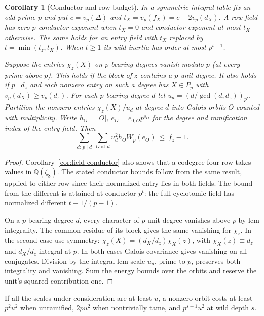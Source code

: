 \documentclass[11pt,a4paper]{article}
\numberwithin{equation}{section}
\newtheorem{corollary}[theorem]{Corollary}
\theoremstyle{remark}
\newcommand{\QQ}{\mathbb Q}
\begin{document}
\begin{corollary}[Conductor and row budget]\label{fam:M:5.5}\label{cor:table-defect-filtration}
\label{prop:defect-filtration-energy}\label{cor:mixed-block-general-energy}
In a symmetric integral table fix an odd prime $p$ and put $c=v_p(\Delta)$ and
$t_X=v_p(f_X)=c-2v_p(d_X)$. A row field has zero $p$-conductor
exponent when $t_X=0$ and conductor exponent at most $t_X$
otherwise. The same holds for an entry field with $t_X$ replaced by
$t=\min(t_z,t_X)$. When $t\ge1$ its wild inertia has order at most
$p^{t-1}$.

Suppose the entries $\chi_z(X)$ on $p$-bearing degrees vanish
modulo $p$ (at every prime above $p$). This holds if the block of
$z$ contains a $p$-unit degree. It also holds if $p\mid d_z$ and
each nonzero entry on such a degree has $X\in P_p$ with
$v_p(d_X)\ge v_p(d_z)$. For each $p$-bearing degree $d$ let $u_d=(d/\gcd(d,d_z))_{p'}$.
Partition the nonzero entries $\chi_z(X)/u_d$ at degree $d$ into
Galois orbits $O$ counted with multiplicity. Write $h_O=|O|$,
$e_O=e_{0,O}p^{s_O}$ for the degree and ramification index of the
entry field. Then
\begin{equation}\label{eq:merged-row-budget}
 \sum_{d:\,p\mid d}\ \sum_{O\text{ at }d}
                 u_d^2 h_O W_p(e_O)\ \le\ f_z-1 .
\end{equation}
\end{corollary}
\begin{proof}
Corollary~\ref{cor:field-conductor} also shows that a codegree-four
row takes values in $\QQ(\zeta_8)$. The stated conductor bounds follow
from the same result,
applied to either row since their normalized entry lies in both fields.
The bound from the different is attained at conductor $p^t$:
the full cyclotomic field has normalized different $t-1/(p-1)$.

On a $p$-bearing degree $d$, every character of $p$-unit degree
vanishes above $p$ by lcm integrality. The common residue of its
block gives the same vanishing for $\chi_z$. In the second case use symmetry:
$\chi_z(X)=(d_X/d_z)\chi_X(z)$, with $\chi_X(z)\equiv d_z$
and $d_X/d_z$ integral at $p$. In both cases Galois covariance
gives vanishing on all conjugates. Division by the
integral lcm scale $u_d$, prime to $p$, preserves both integrality
and vanishing. Sum the energy bounds over the orbits and reserve
the unit's squared contribution one.
\end{proof}

If all the scales under consideration are at least $u$, a nonzero
orbit costs at least $p^2u^2$ when unramified, $2pu^2$ when
nontrivially tame, and $p^{s+1}u^2$ at wild depth $s$.
\end{document}
